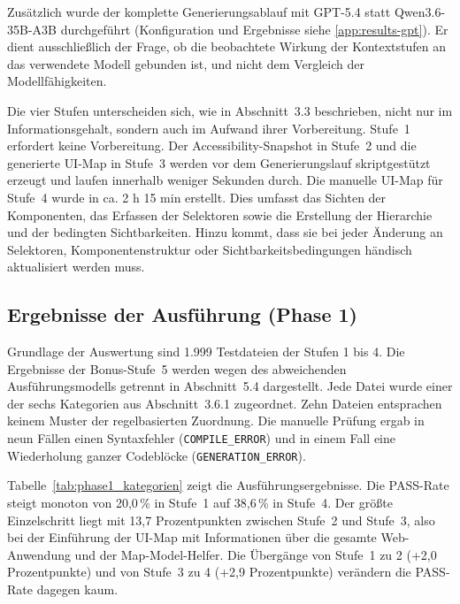 Zusätzlich wurde der komplette Generierungsablauf mit GPT-5.4 statt Qwen3.6-35B-A3B durchgeführt (Konfiguration und Ergebnisse siehe \ref{app:results-gpt}). Er dient ausschließlich der Frage, ob die beobachtete Wirkung der Kontextstufen an das verwendete Modell gebunden ist, und nicht dem Vergleich der Modellfähigkeiten.

Die vier Stufen unterscheiden sich, wie in Abschnitt~3.3 beschrieben, nicht nur im Informationsgehalt, sondern auch im Aufwand ihrer Vorbereitung. Stufe~1 erfordert keine Vorbereitung. Der Accessibility-Snapshot in Stufe~2 und die generierte \ac{UI}-Map in Stufe~3 werden vor dem Generierungslauf skriptgestützt erzeugt und laufen innerhalb weniger Sekunden durch. Die manuelle \ac{UI}-Map für Stufe~4 wurde in ca. 2 h 15 min erstellt. Dies umfasst das Sichten der Komponenten, das Erfassen der Selektoren sowie die Erstellung der Hierarchie und der bedingten Sichtbarkeiten. Hinzu kommt, dass sie bei jeder Änderung an Selektoren, Komponentenstruktur oder Sichtbarkeitsbedingungen händisch aktualisiert werden muss.

\subsection{Ergebnisse der Ausführung (Phase 1)}

Grundlage der Auswertung sind 1.999 Testdateien der Stufen 1 bis 4. Die Ergebnisse der Bonus-Stufe~5 werden wegen des abweichenden Ausführungsmodells getrennt in Abschnitt~5.4 dargestellt. Jede Datei wurde einer der sechs Kategorien aus Abschnitt~3.6.1 zugeordnet. Zehn Dateien entsprachen keinem Muster der regelbasierten Zuordnung. Die manuelle Prüfung ergab in neun Fällen einen Syntaxfehler (\texttt{COMPILE\_ERROR}) und in einem Fall eine Wiederholung ganzer Codeblöcke (\texttt{GENERATION\_ERROR}).

Tabelle~\ref{tab:phase1_kategorien} zeigt die Ausführungsergebnisse. Die PASS-Rate steigt monoton von 20,0\,\% in Stufe~1 auf 38,6\,\% in Stufe~4. Der größte Einzelschritt liegt mit 13,7 Prozentpunkten zwischen Stufe~2 und Stufe~3, also bei der Einführung der \ac{UI}-Map mit Informationen über die gesamte Web-Anwendung und der Map-Model-Helfer. Die Übergänge von Stufe~1 zu 2 (+2,0 Prozentpunkte) und von Stufe~3 zu 4 (+2,9 Prozentpunkte) verändern die PASS-Rate dagegen kaum.

